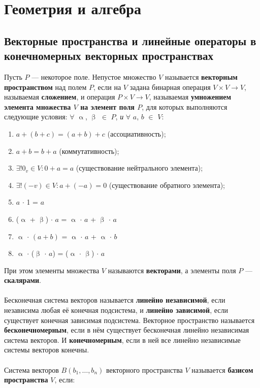 \documentclass[a4paper, 12pt]{report}
\numberwithin{equation}{section}
\renewcommand{\alpha}{\upalpha}
\renewcommand{\beta}{\upbeta}
\begin{document}
	\chapter{Геометрия и алгебра}
	\section{Векторные пространства и линейные операторы в конечномерных векторных пространствах}
	{Пусть $P$ --- некоторое поле. Непустое множество $V$ называется \textbf{векторным пространством} над полем $P$, если на $V$ задана бинарная операция $V\times V \to V$, называемая \textbf{сложением}, и операция $P\times V \to V$, называемая \textbf{умножением элемента множества $V$ на элемент поля $P$}, для которых выполняются следующие условия:}
	$\forall$ $\alpha$, $\beta$ $\in$ $P$, \textit{и} $\forall$ $a$, $b$ $\in$ $V$:
	\begin{enumerate} 
		\item $a + (b + c) = (a + b) + c$ (ассоциативность);
		\item $a + b = b + a$ (коммутативность);
		\item $\exists! 0_v \in V : 0+a = a$ (существование нейтрального элемента);
		\item $\exists! (- v)\in V:a+(-a) = 0$ (существование обратного элемента); 
		\item $a$ $\cdot$ 1 = $a$
		\item ($\alpha$ + $\beta$) $\cdot$ $a$ = $\alpha$ $\cdot$ $a$ + $\beta$ $\cdot$ $a$
		\item $\alpha$ $\cdot$ $(a + b)$ = $\alpha$ $\cdot$ $a$ + $\alpha$ $\cdot$ $b$
		\item $\alpha$ $\cdot$ ($\beta$ $\cdot$ $a$) = ($\alpha$ $\cdot$ $\beta$)  $\cdot$ $a$
	\end{enumerate}
	{При этом элементы множества $V$ называются \textbf{векторами}, а элементы поля $P$ --- \textbf{скалярами}.}\\\\
	{Бесконечная система векторов называется \textbf{линейно независимой}, если независима любая её конечная подсистема, и \textbf{линейно зависимой}, если существует конечная зависимая подсистема. Векторное пространство называется \textbf{бесконечномерным}, если в нём существует бесконечная линейно независимая система векторов. И \textbf{конечномерным}, если в ней все линейно независимые системы векторов конечны.}
	\\\\
	{Система векторов $B(b_1,\ldots,b_n)$ векторного пространства $V$ называется \textbf{базисом пространства} $V$, если:}
\end{document}
